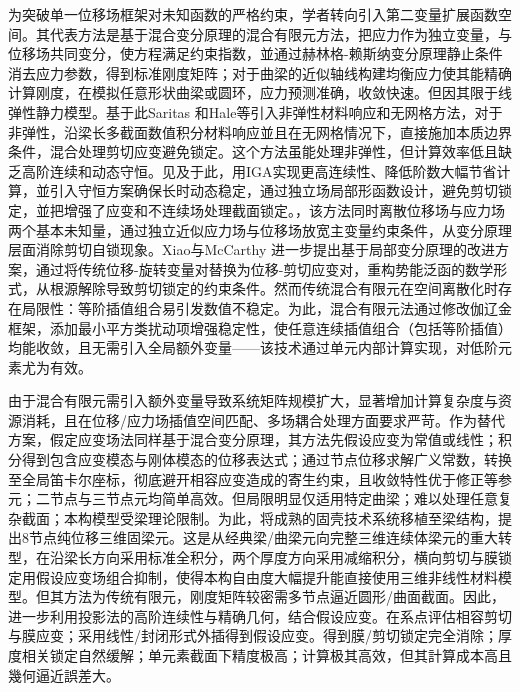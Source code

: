为突破单一位移场框架对未知函数的严格约束，学者转向引入第二变量扩展函数空间。其代表方法是基于混合变分原理的混合有限元方法，把应力作为独立变量，与位移场共同变分，使方程满足约束指数，並通过赫林格-赖斯纳变分原理静止条件消去应力参数，得到标准刚度矩阵；对于曲梁的近似轴线构建均衡应力使其能精确计算刚度，在模拟任意形状曲梁或圆环，应力预测准确，收敛快速\cite{malkus1978, saleeb1987,benedetti1989}。但因其限于线弹性静力模型。基于此Saritas 和Hale等\cite{saritas2009, hale2012}引入非弹性材料响应和无网格方法，对于非弹性，沿梁长多截面数值积分材料响应並且在无网格情况下，直接施加本质边界条件，混合处理剪切应变避免锁定。这个方法虽能处理非弹性，但计算效率低且缺乏高阶连续和动态守恒。见及于此，\cite{ choi2023, gross2019}用IGA实现更高连续性、降低阶数大幅节省计算，並引入守恒方案确保长时动态稳定，通过独立场局部形函数设计，避免剪切锁定，並把增强了应变和不连续场处理截面锁定。，该方法同时离散位移场与应力场两个基本未知量，通过独立近似应力场与位移场放宽主变量约束条件，从变分原理层面消除剪切自锁现象。Xiao与McCarthy \cite{xiao2003}进一步提出基于局部变分原理的改进方案，通过将传统位移-旋转变量对替换为位移-剪切应变对，重构势能泛函的数学形式，从根源解除导致剪切锁定的约束条件。然而传统混合有限元在空间离散化时存在局限性：等阶插值组合易引发数值不稳定。为此，混合有限元法通过修改伽辽金框架\cite{franca1988}，添加最小平方类扰动项增强稳定性，使任意连续插值组合（包括等阶插值）均能收敛，且无需引入全局额外变量——该技术通过单元内部计算实现，对低阶元素尤为有效。

由于混合有限元需引入额外变量导致系统矩阵规模扩大，显著增加计算复杂度与资源消耗，且在位移/应力场插值空间匹配、多场耦合处理方面要求严苛。作为替代方案，假定应变场法同样基于混合变分原理，其方法先假设应变为常值或线性；积分得到包含应变模态与刚体模态的位移表达式；通过节点位移求解广义常数，转换至全局笛卡尔座标，彻底避开相容应变造成的寄生约束，且收敛特性优于修正等参元；二节点与三节点元均简单高效\cite{choit1995, prathap1993, LXXB201302021}。但局限明显仅适用特定曲梁；难以处理任意复杂截面；本构模型受梁理论限制。为此，将成熟的固壳技术系统移植至梁结构，提出8节点纯位移三维固梁元。这是从经典梁/曲梁元向完整三维连续体梁元的重大转型，在沿梁长方向采用标准全积分，两个厚度方向采用减缩积分，横向剪切与膜锁定用假设应变场组合抑制，使得本构自由度大幅提升能直接使用三维非线性材料模型\cite{frischkorn2013}。但其方法为传统有限元，刚度矩阵较密需多节点逼近圆形/曲面截面。因此，进一步利用投影法的高阶连续性与精确几何，结合假设应变。在系点评估相容剪切与膜应变；采用线性/封闭形式外插得到假设应变。得到膜/剪切锁定完全消除；厚度相关锁定自然缓解；单元素截面下精度极高；计算极其高效\cite{patton2025, greco2017}，但其計算成本高且幾何逼近誤差大。


